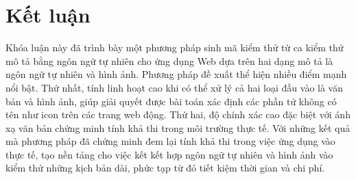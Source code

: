 \documentclass[a4paper, 12pt]{report}
\begin{document}
{%





\chapter{Kết luận}
Khóa luận này đã trình bày một phương pháp sinh mã kiểm thử từ
ca kiểm thử mô tả bằng ngôn ngữ tự nhiên cho ứng dụng Web dựa trên hai dạng mô tả là ngôn ngữ tự nhiên và hình ảnh. Phương pháp đề xuất thể hiện nhiều điểm mạnh nổi bật. Thứ nhất, tính linh hoạt cao khi có thể xử lý cả hai loại đầu vào là văn bản và hình ảnh, giúp giải quyết được bài toán xác định các phần tử không có tên như icon trên các trang web động. Thứ hai, độ chính xác cao đặc biệt với ánh xạ văn bản chứng minh tính khả thi trong môi trường thực tế. Với những kết quả mà phương pháp đã chứng minh đem lại tính khả thi trong việc ứng dụng vào thực tế, tạo nền tảng cho việc kết kết hợp ngôn ngữ tự nhiên và hình ảnh vào kiểm thử những kịch bản dài, phức tạp từ đó tiết kiệm thời gian và chi phí.

}
\end{document}
